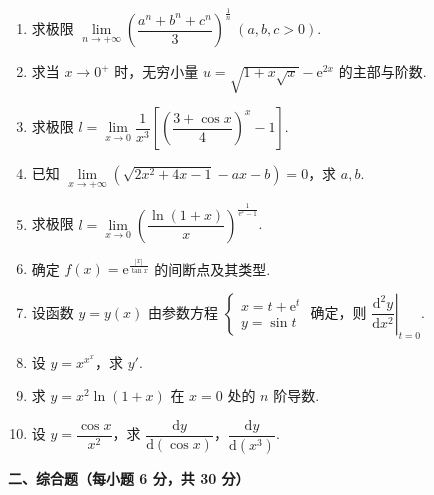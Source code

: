 \documentclass[a4paper,11pt]{ctexart}
\newcommand{\e}{\mathrm{e}}
\newcommand{\dd}{\mathrm{d}}
\begin{document}
\begin{enumerate}[label=\arabic*., leftmargin=2em, itemsep=0.95em, topsep=0.5em]
  \item 求极限 $\lim\limits_{n\to+\infty}\left(\dfrac{a^n + b^n + c^n}{3}\right)^{\frac{1}{n}}~(a, b, c > 0)$.

  \item 求当 $x\to 0^+$ 时，无穷小量 $u = \sqrt{1 + x\sqrt{x}} - \e^{2x}$ 的主部与阶数.

  \item 求极限 $l = \lim\limits_{x\to 0}\dfrac{1}{x^3}\left[\left(\dfrac{3 + \cos x}{4}\right)^x - 1\right]$.

  \item 已知 $\lim\limits_{x\to+\infty}\left(\sqrt{2x^2 + 4x - 1} - ax - b\right) = 0$，求 $a, b$.

  \item 求极限 $l = \lim\limits_{x\to 0}\left(\dfrac{\ln(1+x)}{x}\right)^{\frac{1}{\e^x - 1}}$.

  \item 确定 $f(x) = \e^{\frac{|x|}{\tan x}}$ 的间断点及其类型.

  \item 设函数 $y = y(x)$ 由参数方程 $\begin{cases} x = t + \e^t \\ y = \sin t \end{cases}$ 确定，则 $\left.\dfrac{\dd^2 y}{\dd x^2}\right|_{t=0}$.

  \item 设 $y = x^{x^x}$，求 $y'$.

  \item 求 $y = x^2 \ln(1+x)$ 在 $x = 0$ 处的 $n$ 阶导数.

  \item 设 $y = \dfrac{\cos x}{x^2}$，求 $\dfrac{\dd y}{\dd(\cos x)}$，$\dfrac{\dd y}{\dd(x^3)}$.
\end{enumerate}

\vspace{0.9em}

\textbf{二、综合题（每小题 6 分，共 30 分）}
\end{document}
